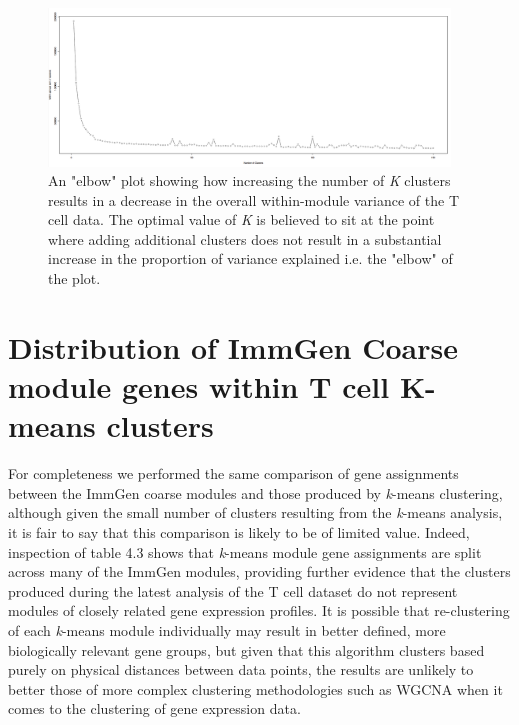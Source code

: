 \begin{figure}[H] 
    \centering
\includegraphics[width=0.95\textwidth]{Figures/Chapter4/kmeans/immgen_tcell_only_wssplot.png}
\caption{\small{An "elbow" plot showing how increasing the number of \textit{K} clusters results in a decrease in the overall within-module variance of the T cell data. The optimal value of \textit{K} is believed to sit at the point where adding additional clusters does not result in a substantial increase in the proportion of variance explained i.e. the "elbow" of the plot.} }
   \label{fig:18}
\end{figure}

\section{Distribution of ImmGen Coarse module genes within T cell K-means clusters}

For completeness we performed the same comparison of gene assignments between the ImmGen coarse modules and those produced by \textit{k}-means clustering, although given the small number of clusters resulting from the \textit{k}-means analysis, it is fair to say that this comparison is likely to be of limited value. Indeed, inspection of table 4.3 shows that \textit{k}-means module gene assignments are split across many of the ImmGen modules, providing further evidence that the clusters produced during the latest analysis of the T cell dataset do not represent modules of closely related gene expression profiles. It is possible that re-clustering of each \textit{k}-means module individually may result in better defined, more biologically relevant gene groups, but given that this algorithm clusters based purely on physical distances between data points, the results are unlikely to better those of more complex clustering methodologies such as WGCNA when it comes to the clustering of gene expression data.

